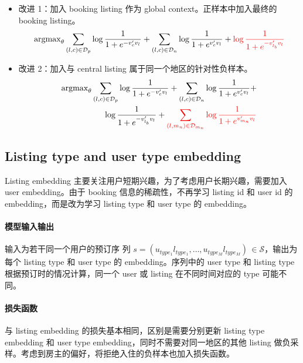 \begin{itemize}
  \item 改进 1：加入 booking listing 作为 global context。正样本中加入最终的
    booking listing。
    \begin{equation}
      \mathrm{argmax}_{\theta} \sum_{(l, c) \in \mathcal{D}_{p}} \log \frac{1}{1 + e^{-v'_c v_l}} + \sum_{(l, c) \in \mathcal{D}_{n}} \log \frac{1}{1 + e^{v'_c v_l}} + {\color{red}{\log \frac{1}{1 + e^{-v'_{l_b}v_l}}}}
    \end{equation}
  \item 改进 2：加入与 central listing 属于同一个地区的针对性负样本。
    \begin{equation}
    \begin{split}
      \mathrm{argmax}_{\theta} \sum_{(l, c) \in \mathcal{D}_{p}} \log \frac{1}{1 + e^{-v'_c v_l}} + \sum_{(l, c) \in \mathcal{D}_{n}} \log \frac{1}{1 + e^{v'_c v_l}} + \\ {\log \frac{1}{1 + e^{-v'_{l_b}v_l}}} + {\color{red}{\sum_{(l, m_n) \in \mathcal{D}_{m_n}} \log \frac{1}{1 + e^{v'_{m_n} v_l}}}}
    \end{split}
  \end{equation}
\end{itemize}

\subsection{Listing type and user type embedding}
Listing embedding 主要关注用户短期兴趣，为了考虑用户长期兴趣，需要加入 user
embedding。由于 booking 信息的稀疏性，不再学习 listing id 和 user
id 的 embedding，而是改为学习 listing type 和 user type 的 embedding。

\paragraph{模型输入输出} 输入为若干同一个用户的预订序
列 $s=(u_{type_1}l_{type_1}, \ldots, u_{type_M}l_{type_M}) \, \in \mathcal{S}$，输出为
每个 listing type 和 user type 的 embedding。序列中的 user type 和 listing type
根据预订时的情况计算，同一个 user 或 listing 在不同时间对应的 type 可能不同。

\paragraph{损失函数} 与 listing embedding 的损失基本相同，区别是需要分别更新
listing type embedding 和 user type embedding，同时不需要对同一地区的其他
listing 做负采样。考虑到房主的偏好，将拒绝入住的负样本也加入损失函数。

